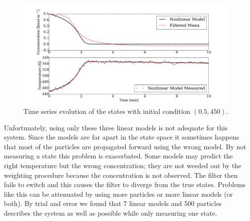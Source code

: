 \documentclass[../masters.tex]{subfiles}
\begin{document}
\begin{figure}[H] 
\centering
\includegraphics[scale=0.3]{skf_s3_t.pdf}
\caption{Time series evolution of the states with initial condition $(0.5, 450)$.}
\label{fig_3mod_t}
\end{figure}
Unfortunately, using only these three linear models is not adequate for this system. Since the models are far apart in the state space it sometimes happens that most of the particles are propagated forward using the wrong model. By not measuring a state this problem is exacerbated. Some models may predict the right temperature but the wrong concentration; they are not weeded out by the weighting procedure because the concentration is not observed. The filter then fails to switch and this causes the filter to diverge from the true states. Problems like this can be attenuated by using more particles or more linear models (or both). By trial and error we found that 7 linear models and 500 particles describes the system as well as possible while only measuring one state.
\end{document}
